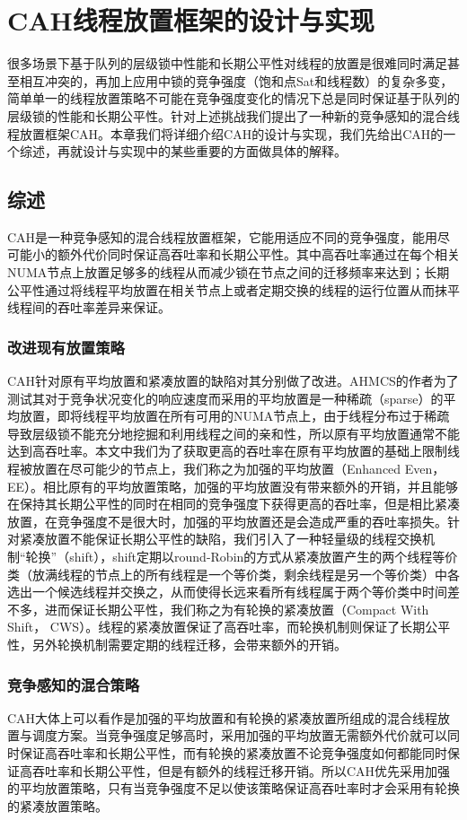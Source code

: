 \chapter{CAH线程放置框架的设计与实现}
\label{chap:faq}
很多场景下基于队列的层级锁中性能和长期公平性对线程的放置是很难同时满足甚至相互冲突的，再加上应用中锁的竞争强度（饱和点Sat和线程数）的复杂多变，简单单一的线程放置策略不可能在竞争强度变化的情况下总是同时保证基于队列的层级锁的性能和长期公平性。针对上述挑战我们提出了一种新的竞争感知的混合线程放置框架CAH。本章我们将详细介绍CAH的设计与实现，我们先给出CAH的一个综述，再就设计与实现中的某些重要的方面做具体的解释。

\section{综述}
CAH是一种竞争感知的混合线程放置框架，它能用适应不同的竞争强度，能用尽可能小的额外代价同时保证高吞吐率和长期公平性。其中高吞吐率通过在每个相关NUMA节点上放置足够多的线程从而减少锁在节点之间的迁移频率来达到；长期公平性通过将线程平均放置在相关节点上或者定期交换的线程的运行位置从而抹平线程间的吞吐率差异来保证。

\subsection{改进现有放置策略}
CAH针对原有平均放置和紧凑放置的缺陷对其分别做了改进。AHMCS的作者为了测试其对于竞争状况变化的响应速度而采用的平均放置是一种稀疏（sparse）的平均放置，即将线程平均放置在所有可用的NUMA节点上，由于线程分布过于稀疏导致层级锁不能充分地挖掘和利用线程之间的亲和性，所以原有平均放置通常不能达到高吞吐率。本文中我们为了获取更高的吞吐率在原有平均放置的基础上限制线程被放置在尽可能少的节点上，我们称之为加强的平均放置（Enhanced Even， EE）。相比原有的平均放置策略，加强的平均放置没有带来额外的开销，并且能够在保持其长期公平性的同时在相同的竞争强度下获得更高的吞吐率，但是相比紧凑放置，在竞争强度不是很大时，加强的平均放置还是会造成严重的吞吐率损失。针对紧凑放置不能保证长期公平性的缺陷，我们引入了一种轻量级的线程交换机制“轮换”（shift），shift定期以round-Robin的方式从紧凑放置产生的两个线程等价类（放满线程的节点上的所有线程是一个等价类，剩余线程是另一个等价类）中各选出一个候选线程并交换之，从而使得长远来看所有线程属于两个等价类中时间差不多，进而保证长期公平性，我们称之为有轮换的紧凑放置（Compact With Shift， CWS）。线程的紧凑放置保证了高吞吐率，而轮换机制则保证了长期公平性，另外轮换机制需要定期的线程迁移，会带来额外的开销。

\subsection{竞争感知的混合策略}
CAH大体上可以看作是加强的平均放置和有轮换的紧凑放置所组成的混合线程放置与调度方案。当竞争强度足够高时，采用加强的平均放置无需额外代价就可以同时保证高吞吐率和长期公平性，而有轮换的紧凑放置不论竞争强度如何都能同时保证高吞吐率和长期公平性，但是有额外的线程迁移开销。所以CAH优先采用加强的平均放置策略，只有当竞争强度不足以使该策略保证高吞吐率时才会采用有轮换的紧凑放置策略。

